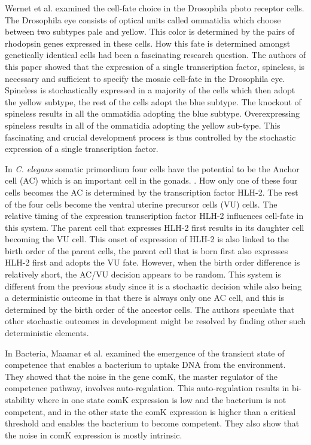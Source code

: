 Wernet et al. \cite{wernet_stochastic_2006} examined the cell-fate choice in the Drosophila photo receptor cells. The Drosophila eye consists of optical units called ommatidia which choose between two subtypes pale and yellow. This color is determined by the pairs of rhodopsin genes expressed in these cells. How this fate is determined amongst genetically identical cells had been a fascinating research question. The authors of this paper showed that the expression of a single transcription factor, spineless, is necessary and sufficient to specify the mosaic cell-fate in the Drosophila eye. Spineless is stochastically expressed in a majority of the cells which then adopt the yellow subtype, the rest of the cells adopt the blue subtype. The knockout of spineless results in all the ommatidia adopting the blue subtype. Overexpressing spineless results in all of the ommatidia adopting the yellow sub-type. This fascinating and crucial development process is thus controlled by the stochastic expression of a single transcription factor.

In \emph{C. elegans} somatic primordium four cells have the potential to be the Anchor cell (AC) which is an important cell in the gonads. \cite{attner2019cb}. How only one of these four cells becomes the AC is determined by the transcription factor HLH-2. The rest of the four cells become the ventral uterine precursor cells (VU) cells. The relative timing of the expression transcription factor HLH-2 influences cell-fate in this system. The parent cell that expresses HLH-2 first results in its daughter cell becoming the VU cell. This onset of expression of HLH-2 is also linked to the birth order of the parent cells, the parent cell that is born first also expresses HLH-2 first and adopts the VU fate. However, when the birth order difference is relatively short, the AC/VU decision appears to be random. This system is different from the previous study since it is a stochastic decision while also being a deterministic outcome in that there is always only one AC cell, and this is determined by the birth order of the ancestor cells. The authors speculate that other stochastic outcomes in development might be resolved by finding other such deterministic elements. 

In Bacteria, Maamar et al. \cite{maamar2007s} examined the emergence of the transient state of competence that enables a bacterium to uptake DNA from the environment. They showed that the noise in the gene comK, the master regulator of the competence pathway, involves auto-regulation. This auto-regulation results in bi-stability where in one state comK expression is low and the bacterium is not competent, and in the other state the comK expression is higher than a critical threshold and enables the bacterium to become competent. They also show that the noise in comK expression is mostly intrinsic.

